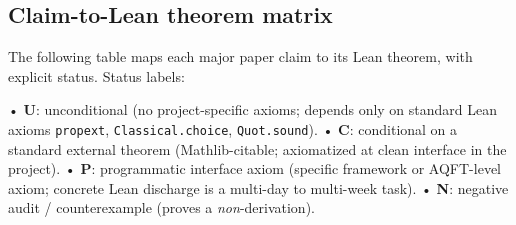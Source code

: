 \documentclass[11pt,a4paper]{article}
\begin{document}
\subsection{Claim-to-Lean theorem matrix}

The following table maps each major paper claim to its Lean theorem, with explicit status. Status labels:

  • \textbf{U}: unconditional (no project-specific axioms; depends only on standard Lean axioms \texttt{propext}, \texttt{Classical.choice}, \texttt{Quot.sound}).
  • \textbf{C}: conditional on a standard external theorem (Mathlib-citable; axiomatized at clean interface in the project).
  • \textbf{P}: programmatic interface axiom (specific framework or AQFT-level axiom; concrete Lean discharge is a multi-day to multi-week task).
  • \textbf{N}: negative audit / counterexample (proves a \emph{non}-derivation).
\end{document}
